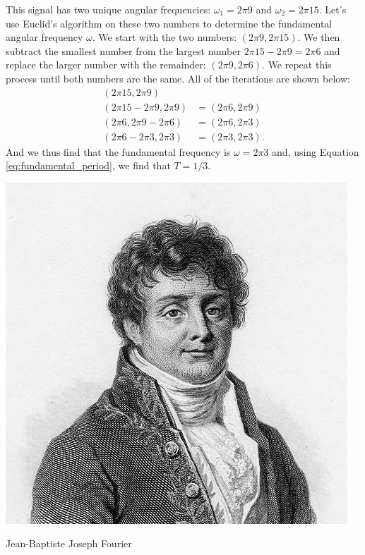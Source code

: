 This signal has two unique angular frequencies: $\omega_1 = 2\pi 9$ and $\omega_2 = 2\pi 15$. Let's use Euclid's algorithm on these two numbers to determine the fundamental angular frequency $\omega$. We start with the two numbers: $(2\pi 9, 2\pi15)$. We then subtract the smallest number from the largest number $2\pi 15 - 2\pi 9 = 2\pi 6$ and replace the larger number with the remainder: $(2\pi 9, 2\pi 6)$. We repeat this process until both numbers are the same. All of the iterations are shown below:
\begin{align*}
(2\pi 15, 2\pi 9) &\\
(2\pi 15-2\pi 9, 2\pi 9) &= (2\pi 6, 2\pi 9) \\
(2\pi 6, 2\pi 9-2\pi 6) &= (2\pi 6, 2\pi 3) \\
(2\pi 6-2\pi 3, 2\pi 3) &= (2\pi 3, 2\pi 3).
\end{align*}
And we thus find that the fundamental frequency is $\omega=2\pi 3$ and, using Equation \ref{eq:fundamental_period}, we find that $T = 1/3$.

\begin{marginfigure}[1cm]
\begin{center}
  \includegraphics[width=\textwidth]{ch01/figures/fourier_head.jpg}
\end{center}
\caption{Jean-Baptiste Joseph Fourier}
\label{fig:joe_fourier2}
\end{marginfigure}


